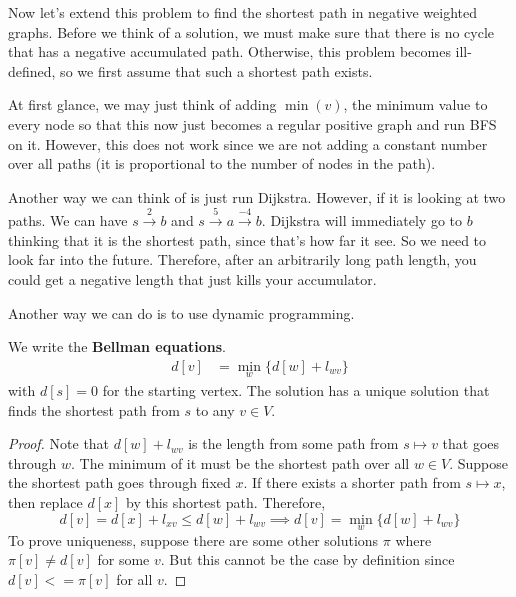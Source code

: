 \documentclass{article}
\begin{document}
    Now let's extend this problem to find the shortest path in negative weighted graphs. Before we think of a solution, we must make sure that there is no cycle that has a negative accumulated path. Otherwise, this problem becomes ill-defined, so we first assume that such a shortest path exists. 

    At first glance, we may just think of adding $\min(v)$, the minimum value to every node so that this now just becomes a regular positive graph and run BFS on it. However, this does not work since we are not adding a constant number over all paths (it is proportional to the number of nodes in the path). 

    Another way we can think of is just run Dijkstra. However, if it is looking at two paths. We can have $s \xrightarrow{2} b$ and $s \xrightarrow{5} a \xrightarrow{-4} b$. Dijkstra will immediately go to $b$ thinking that it is the shortest path, since that's how far it see. So we need to look far into the future. Therefore, after an arbitrarily long path length, you could get a negative length that just kills your accumulator.  

    Another way we can do is to use dynamic programming. 

    \begin{theorem}
      We write the \textbf{Bellman equations}. 
      \begin{align}
        d[v] & = \min_{w} \{ d[w] + l_{w v}\}
      \end{align}
      with $d[s] = 0$ for the starting vertex. The solution has a unique solution that finds the shortest path from $s$ to any $v \in V$.    
    \end{theorem}
    \begin{proof}
      Note that $d[w] + l_{wv}$ is the length from some path from $s \mapsto v$ that goes through $w$. The minimum of it must be the shortest path over all $w \in V$. Suppose the shortest path goes through fixed $x$. If there exists a shorter path from $s \mapsto x$, then replace $d[x]$ by this shortest path. Therefore, 
      \begin{equation}
        d[v] = d[x] + l_{xv} \leq d[w] + l_{wv} \implies d[v] = \min_{w} \{d[w] + l_{w v}\}
      \end{equation}
      To prove uniqueness, suppose there are some other solutions $\pi$ where $\pi[v] \neq d[v]$ for some $v$. But this cannot be the case by definition since $d[v] <= \pi[v]$ for all $v$. 
    \end{proof}
\end{document}
